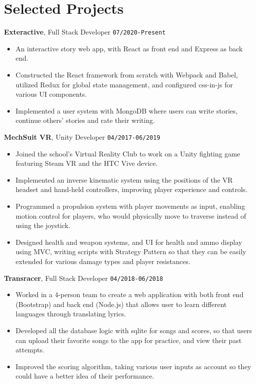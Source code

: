 \documentclass[10pt, letterpaper]{article}
\begin{document}
	\section{Selected Projects}
	\smallskip
	\textbf{\large Exteractive}, Full Stack Developer \hfill \texttt{07/2020-Present}
	\begin{itemize}
		\item An interactive story web app, with React as front end and Express as back end.

		\item Constructed the React framework from scratch with Webpack and Babel, utilized Redux for global state management, and configured css-in-js for various UI components.

		\item Implemented a user system with MongoDB where users can write stories, continue others' stories and rate their writing.

	\end{itemize}
	\textbf{\large MechSuit VR}, Unity Developer \hfill \texttt{04/2017-06/2019}
	\begin{itemize}
		\item Joined the school's Virtual Reality Club to work on a Unity fighting game featuring Steam VR and the HTC Vive device.

		\item Implemented an inverse kinematic system using the positions of the VR headset and hand-held controllers, improving player experience and controls.

		\item Programmed a propulsion system with player movements as input, enabling motion control for players, who would physically move to traverse instead of using the joystick.

		\item Designed health and weapon systems, and UI for health and ammo display using MVC, writing scripts with Strategy Pattern so that they can be easily extended for various damage types and player resistances.

	\end{itemize}
	\textbf{\large Transracer}, Full Stack Developer \hfill \texttt{04/2018-06/2018}
	\begin{itemize}
		\item Worked in a 4-person team to create a web application with both front end (Bootstrap) and back end (Node.js) that allows user to learn different languages through translating lyrics.

		\item Developed all the database logic with sqlite for songs and scores, so that users can upload their favorite songs to the app for practice, and view their past attempts.

		\item Improved the scoring algorithm, taking various user inputs as account so they could have a better idea of their performance.

	\end{itemize}
\end{document}
